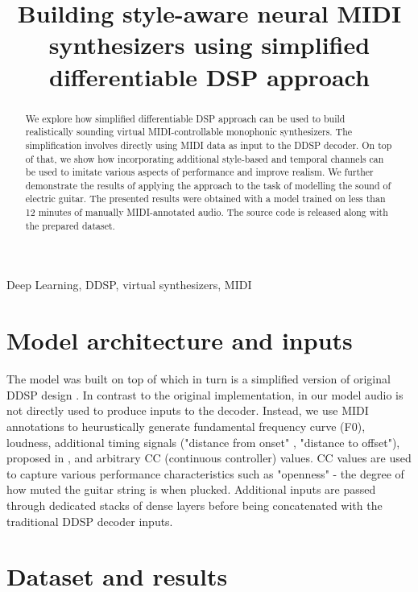 \documentclass{article}
\title{Building style-aware neural MIDI synthesizers using simplified differentiable DSP approach}
\begin{document}
\tenpt
\maketitle

\begin{sloppy}
\begin{abstract}
We explore how simplified differentiable DSP approach can be used to build realistically sounding virtual MIDI-controllable monophonic synthesizers. The simplification involves directly using  MIDI data as input to the DDSP decoder. On top of that, we show how  incorporating additional style-based and temporal channels can be used to imitate various aspects of performance and improve realism.  We further demonstrate the results of applying the approach to the task of modelling the sound of electric guitar. The presented results were obtained with a model trained on less than 12 minutes of manually MIDI-annotated audio. The source code is released along with the prepared dataset.
\end{abstract}

\begin{keywords}
Deep Learning, DDSP, virtual synthesizers, MIDI
\end{keywords}

\section{Model architecture and inputs}
\label{sec:architecture_and_inputs}

The model was built on top of \cite{ddsp_simplified_repo} which in turn is a simplified version of original DDSP design \cite{ddsp}. In contrast to the original implementation, in our model audio is not directly used to produce inputs to the decoder. 
Instead, we use MIDI annotations to heurustically generate fundamental frequency curve (F0), loudness, additional timing signals ("distance from onset" , "distance to offset"), proposed in \cite{control-synthesis}, and arbitrary CC (continuous controller) values. CC values are used to capture various performance characteristics such as "openness" - the degree of how muted the guitar string is when plucked.
Additional inputs are passed through dedicated stacks of dense layers before being concatenated with the traditional DDSP decoder inputs.

\section{Dataset and results}
\label{sec:dataset_and_results}


\end{sloppy}
\end{document}
